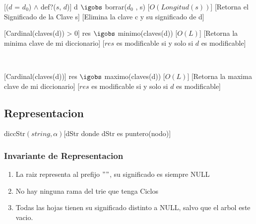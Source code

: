   [($d$ = $d_0$) $\wedge$ def?($s$, $d$)]
  {d $\igobs$ borrar($d_0$ , s)}
  [$O(Longitud(s))$]
  [Retorna el Significado de la Clave s]
  [Elimina la clave c y su significado de d]
 
  [Cardinal(claves(d)) > 0]
  {res $\igobs$ minimo(claves(d))}
  [$O(L)$]
  [Retorna la minima clave de mi diccionario]
  [$res$ es modificable si y solo si $d$ es modificable]
  
  ~
  
  [Cardinal(claves(d))]
  {res $\igobs$ maximo(claves(d))}
  [$O(L)$]
  [Retorna la maxima clave de mi diccionario]
  [$res$ es modificable si y solo si $d$ es modificable]
 

\subsection{Representacion}

	\begin{Estructura}{diccStr$(string, \alpha)$}[dStr donde dStr es puntero(nodo)]
		\begin{Tupla}[nodo]
		\end{Tupla}
	\end{Estructura}

\subsubsection{Invariante de Representacion}

\begin{enumerate}
\item La raiz representa al prefijo $" "$, su significado es siempre NULL
\item No hay ninguna rama del trie que tenga Ciclos
\item Todas las hojas tienen su significado distinto a NULL, salvo que el arbol este vacio.


\end{enumerate}



